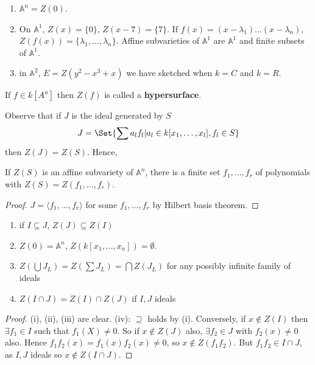 \documentclass{article}
\newcommand{\A}{\mathbb{A}}
\begin{document}
\begin{eg}
    \begin{enumerate}[label=(\Roman*)]
        \item $\A^n = Z(0)$.
        \item On $\A^1$, $Z(x) = \{0\}$, $Z(x-7) = \{7\}$.  If $f(x) = (x - \lambda_1)\dotsc (x-\lambda_n)$, $Z(f(x)) = \{\lambda_1, \dotsc, \lambda_n\}$.
            Affine subvarieties of $\A^1$ are $\A^1$ and finite subsets of $\A^1$.
        \item in $\A^2$, $E=Z(y^2-x^3+x)$ we have sketched when $k=C$ and $k=R$.

    \end{enumerate}
\end{eg}

\begin{remark}
    If $f \in k[A^n]$ then $Z(f)$ is called a \textbf{hypersurface}.
\end{remark}

Observe that if $J$ is the ideal generated by $S$
\begin{equation*}
    J = \Set{\sum a_l f_l | a_l \in k[x_1, \dotsc, x_l], f_l \in S}
\end{equation*}
then $Z(J) = Z(S)$.  Hence,
\begin{thm}
    If $Z(S)$ is an affine subvariety of $\A^n$, there is a finite set $f_1, \dotsc, f_r$ of polynomials with $Z(S) = Z(f_1, \dotsc, f_r)$.
\end{thm}

\begin{proof}
    $J = \langle f_1, \dotsc, f_r \rangle$ for some $f_1, \dotsc, f_r$ by Hilbert basis theorem.
\end{proof}

\begin{lemma}
    \leavevmode
    \begin{enumerate}[label=(\roman*)]
        \item if $I \subseteq J$, $Z(J) \subseteq Z(I)$
        \item $Z(0) = \A^n$, $Z(k[x_1, \dotsc, x_n]) = \emptyset$.
        \item $Z\left(\bigcup J_L\right) = Z(\sum J_L) = \bigcap Z(J_L)$ for any possibly infinite family of ideals
        \item $Z(I \cap J) = Z(I) \cap Z(J)$ if $I, J$ ideals
    \end{enumerate}
\end{lemma}
\begin{proof}
    (i), (ii), (iii) are clear.
    (iv): $\supseteq$ holds by (i). Conversely, if $x \notin Z(I)$ then $\exists f_1 \in I$ such that $f_1(X) \neq 0$.
    So if $x \notin Z(J)$ also, $\exists f_2 \in J$ with $f_2(x) \neq 0$ also.
    Hence $f_1 f_2(x) = f_1(x) f_2(x) \neq 0$, so $x \notin Z(f_1 f_2)$. But $f_1 f_2 \in I \cap J$, as $I, J$ ideals so $x \notin Z(I \cap J)$.
\end{proof}
\end{document}
